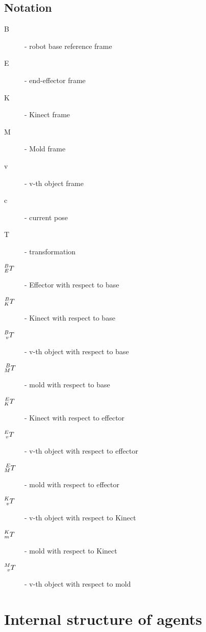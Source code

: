 \documentclass[12pt]{article}
\begin{document}
\subsection{Notation}
\begin{description}
    \item[B] - robot base reference frame
    \item[E] - end-effector frame
    \item[K] - Kinect frame
    \item[M] - Mold frame
    \item[v] - v-th object frame
    \item[c] - current pose
    \item[T] - transformation
    \item[$\prescript{B}{E}{T}$] - Effector with respect to base
   	\item[$\prescript{B}{K}{T}$] - Kinect with respect to base
   	\item[$\prescript{B}{v}{T}$] - v-th object with respect to base
   	\item[$\prescript{B}{M}{T}$] - mold with respect to base
    \item[$\prescript{E}{K}{T}$] - Kinect with respect to effector
   	\item[$\prescript{E}{v}{T}$] - v-th object with respect to effector
   	\item[$\prescript{E}{M}{T}$] - mold with respect to effector
   	\item[$\prescript{K}{v}{T}$] - v-th object with respect to Kinect
    \item[$\prescript{K}{m}{T}$] - mold with respect to Kinect
   	\item[$\prescript{M}{v}{T}$] - v-th object with respect to mold
\end{description}

\section{Internal structure of agents}



\end{document}
